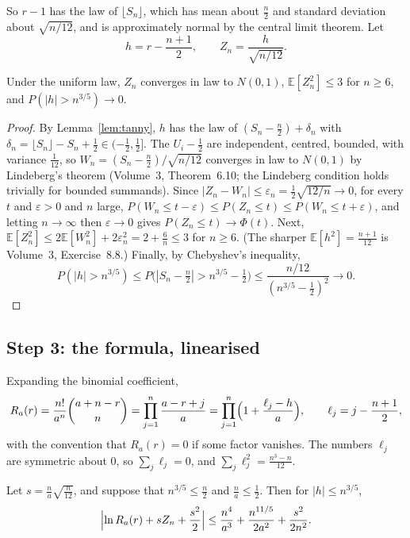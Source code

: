 So $r-1$ has the law of $\lfloor S_n\rfloor$, which has mean about $\frac n2$ and standard deviation about $\sqrt{n/12}$, and is approximately normal by the central limit
theorem. Let
\[
h=r-\frac{n+1}2,\qquad Z_n=\frac h{\sqrt{n/12}}.
\]

\begin{lemma}\label{lem:risingclt}
Under the uniform law, $Z_n$ converges in law to $N(0,1)$, $\mathbb E[Z_n^2]\le3$ for $n\ge6$, and $P(|h|>n^{3/5})\to0$.
\end{lemma}

\begin{proof}
By Lemma~\ref{lem:tanny}, $h$ has the law of $(S_n-\frac n2)+\delta_n$ with $\delta_n=\lfloor S_n\rfloor-S_n+\frac12\in(-\frac12,\frac12]$. The $U_i-\frac12$ are independent, centred, bounded, with variance
$\frac1{12}$, so $W_n=(S_n-\frac n2)/\sqrt{n/12}$ converges in law to $N(0,1)$ by Lindeberg's theorem (Volume~3, Theorem~6.10; the Lindeberg condition holds trivially for
bounded summands). Since $|Z_n-W_n|\le\varepsilon_n=\frac12\sqrt{12/n}\to0$, for every $t$ and $\varepsilon>0$ and $n$ large, $P(W_n\le t-\varepsilon)\le P(Z_n\le t)\le P(W_n\le t+\varepsilon)$, and letting
$n\to\infty$ then $\varepsilon\to0$ gives $P(Z_n\le t)\to\Phi(t)$. Next, $\mathbb E[Z_n^2]\le2\mathbb E[W_n^2]+2\varepsilon_n^2=2+\frac6n\le3$ for $n\ge6$. (The sharper $\mathbb E[h^2]=\frac{n+1}{12}$ is Volume~3, Exercise~8.8.) Finally, by Chebyshev's inequality,
\[
P(|h|>n^{3/5})\le P\bigl(|S_n-\tfrac n2|>n^{3/5}-\tfrac12\bigr)\le\frac{n/12}{(n^{3/5}-\frac12)^2}\longrightarrow0.
\]
\end{proof}

\subsection*{Step 3: the formula, linearised}

Expanding the binomial coefficient,
\[
R_a(r)=\frac{n!}{a^n}\binom{a+n-r}n=\prod_{j=1}^n\frac{a-r+j}a=\prod_{j=1}^n\Bigl(1+\frac{\ell_j-h}a\Bigr),\qquad\ell_j=j-\frac{n+1}2,
\]
with the convention that $R_a(r)=0$ if some factor vanishes. The numbers $\ell_j$ are symmetric about $0$, so $\sum_j\ell_j=0$, and $\sum_j\ell_j^2=\frac{n^3-n}{12}$.

\begin{lemma}\label{lem:linearise}
Let $s=\frac{n}{a}\sqrt{\frac n{12}}$, and suppose that $n^{3/5}\le\frac n2$ and $\frac na\le\frac12$. Then for $|h|\le n^{3/5}$,
\[
\Bigl|\ln R_a(r)+sZ_n+\frac{s^2}2\Bigr|\le\frac{n^4}{a^3}+\frac{n^{11/5}}{2a^2}+\frac{s^2}{2n^2}.
\]
\end{lemma}

